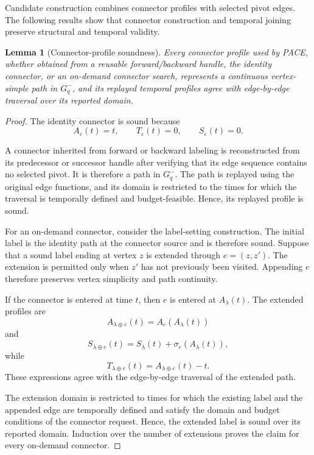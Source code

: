 \documentclass[a4paper,fleqn]{cas-dc}
\newtheorem{lemma}{Lemma}
\begin{document}
Candidate construction combines connector profiles with selected pivot edges.
The following results show that connector construction and temporal joining
preserve structural and temporal validity.

\begin{lemma}[Connector-profile soundness]
\label{lem:connector_soundness}
Every connector profile used by PACE, whether obtained from a reusable
forward/backward handle, the identity connector, or an on-demand connector
search, represents a continuous vertex-simple path in \(G_q^{-}\), and its
replayed temporal profiles agree with edge-by-edge traversal over its reported
domain.
\end{lemma}

\begin{proof}
The identity connector is sound because
\[
A_{\varepsilon}(t)=t,
\qquad
T_{\varepsilon}(t)=0,
\qquad
S_{\varepsilon}(t)=0.
\]

A connector inherited from forward or backward labeling is reconstructed from
its predecessor or successor handle after verifying that its edge sequence
contains no selected pivot. It is therefore a path in \(G_q^{-}\). The path
is replayed using the original edge functions, and its domain is restricted to
the times for which the traversal is temporally defined and budget-feasible.
Hence, its replayed profile is sound.

For an on-demand connector, consider the label-setting construction. The
initial label is the identity path at the connector source and is therefore
sound. Suppose that a sound label ending at vertex \(z\) is extended through
\(e=(z,z')\). The extension is permitted only when \(z'\) has not previously
been visited. Appending \(e\) therefore preserves vertex simplicity and path
continuity.

If the connector is entered at time \(t\), then \(e\) is entered at
\(A_{\lambda}(t)\). The extended profiles are
\[
A_{\lambda\oplus e}(t)
=
A_e\!\left(A_{\lambda}(t)\right)
\]
and
\[
S_{\lambda\oplus e}(t)
=
S_{\lambda}(t)
+
\sigma_e\!\left(A_{\lambda}(t)\right),
\]
while
\[
T_{\lambda\oplus e}(t)
=
A_{\lambda\oplus e}(t)-t.
\]
These expressions agree with the edge-by-edge traversal of the extended path.

The extension domain is restricted to times for which the existing label and
the appended edge are temporally defined and satisfy the domain and budget
conditions of the connector request. Hence, the extended label is sound over
its reported domain. Induction over the number of extensions proves the claim
for every on-demand connector.
\end{proof}
\end{document}
